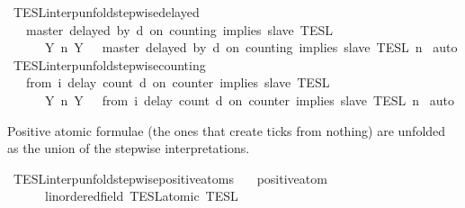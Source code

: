 \begin{isabellebody}
%
\endisadelimproof
\isanewline
{}\isamarkupfalse%
\ TESL{\isacharunderscore}interp{\isacharunderscore}unfold{\isacharunderscore}stepwise{\isacharunderscore}delayed{\isacharcolon}\isanewline
\ \ {\isacartoucheopen}{\isasymlbrakk}\ master\ delayed\ by\ d\ on\ counting\ implies\ slave\ {\isasymrbrakk}\isactrlsub T\isactrlsub E\isactrlsub S\isactrlsub L\isanewline
\ \ \ \ {\isacharequal}\ {\isasymInter}\ {\isacharbraceleft}Y{\isachardot}\ {\isasymexists}n{\isachardot}\ Y\ {\isacharequal}\ {\isasymlbrakk}\ master\ delayed\ by\ d\ on\ counting\ implies\ slave\ {\isasymrbrakk}\isactrlsub T\isactrlsub E\isactrlsub S\isactrlsub L\isactrlbsup {\isasymge}\ n\isactrlesup {\isacharbraceright}{\isacartoucheclose}\isanewline
%
\isadelimproof
%
\endisadelimproof
%
\isatagproof
{}\isamarkupfalse%
\ auto%
\endisatagproof
{\isafoldproof}%
%
\isadelimproof
\isanewline
%
\endisadelimproof
\isanewline
{}\isamarkupfalse%
\ TESL{\isacharunderscore}interp{\isacharunderscore}unfold{\isacharunderscore}stepwise{\isacharunderscore}counting{\isacharcolon}\isanewline
\ \ {\isacartoucheopen}{\isasymlbrakk}\ from\ i\ delay\ count\ d\ on\ counter\ implies\ slave\ {\isasymrbrakk}\isactrlsub T\isactrlsub E\isactrlsub S\isactrlsub L\isanewline
\ \ \ \ {\isacharequal}\ {\isasymInter}\ {\isacharbraceleft}Y{\isachardot}\ {\isasymexists}n{\isachardot}\ Y\ {\isacharequal}\ {\isasymlbrakk}\ from\ i\ delay\ count\ d\ on\ counter\ implies\ slave\ {\isasymrbrakk}\isactrlsub T\isactrlsub E\isactrlsub S\isactrlsub L\isactrlbsup {\isasymge}\ n\isactrlesup {\isacharbraceright}{\isacartoucheclose}\isanewline
%
\isadelimproof
%
\endisadelimproof
%
\isatagproof
{}\isamarkupfalse%
\ auto%
\endisatagproof
{\isafoldproof}%
%
\isadelimproof
%
\endisadelimproof
%
\begin{isamarkuptext}%
Positive atomic formulae (the ones that create ticks from nothing) are unfolded
  as the union of the stepwise interpretations.%
\end{isamarkuptext}\isamarkuptrue%
\isamarkupfalse%
\ TESL{\isacharunderscore}interp{\isacharunderscore}unfold{\isacharunderscore}stepwise{\isacharunderscore}positive{\isacharunderscore}atoms{\isacharcolon}\isanewline
\ \ \ {\isacartoucheopen}positive{\isacharunderscore}atom\ {\isasymphi}{\isacartoucheclose}\isanewline
\ \ \ \ \ {\isacartoucheopen}{\isasymlbrakk}\ {\isasymphi}{\isacharcolon}{\isacharcolon}{\isacharprime}{\isasymtau}{\isacharcolon}{\isacharcolon}linordered{\isacharunderscore}field\ TESL{\isacharunderscore}atomic\ {\isasymrbrakk}\isactrlsub T\isactrlsub E\isactrlsub S\isactrlsub L\isanewline

\end{isabellebody}
